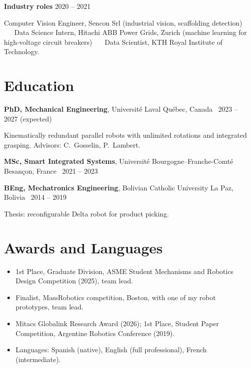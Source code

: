 \documentclass[10pt,a4paper]{article}
\begin{document}
\vspace{3pt}
\textbf{Industry roles} \hfill {\color{muted}2020 -- 2021}\par
{\small Computer Vision Engineer, Sencon Srl (industrial vision, scaffolding detection) \ \textbullet\ \ Data Science
Intern, Hitachi ABB Power Grids, Zurich (machine learning for high-voltage circuit breakers) \ \textbullet\ \ Data
Scientist, KTH Royal Institute of Technology.}

\section{Education}
\textbf{PhD, Mechanical Engineering}, Universit\'e Laval \hfill {\color{muted}Qu\'ebec, Canada \textbar\ 2023 -- 2027 (expected)}\par
{\small Kinematically redundant parallel robots with unlimited rotations and integrated grasping. Advisors: C.~Gosselin, P.~Lambert.}\par\vspace{2pt}
\textbf{MSc, Smart Integrated Systems}, Universit\'e Bourgogne--Franche-Comt\'e \hfill {\color{muted}Besan\c{c}on, France \textbar\ 2021 -- 2023}\par\vspace{2pt}
\textbf{BEng, Mechatronics Engineering}, Bolivian Catholic University \hfill {\color{muted}La Paz, Bolivia \textbar\ 2014 -- 2019}\par
{\small Thesis: reconfigurable Delta robot for product picking.}

\section{Awards and Languages}
\begin{itemize}
\item 1st Place, Graduate Division, ASME Student Mechanisms and Robotics Design Competition (2025), team lead.
\item Finalist, MassRobotics competition, Boston, with one of my robot prototypes, team lead.
\item Mitacs Globalink Research Award (2026); 1st Place, Student Paper Competition, Argentine Robotics Conference (2019).
\item Languages: Spanish (native), English (full professional), French (intermediate).
\end{itemize}

\newpage
\end{document}
